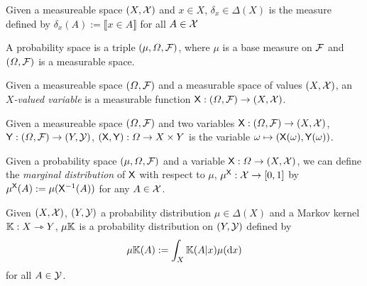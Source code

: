 \begin{definition}
Given a measureable space $(X,\mathcal{X})$ and $x\in X$, $\delta_x\in \Delta(X)$ is the measure defined by $\delta_x(A):=\llbracket x\in A \rrbracket$ for all $A\in \mathcal{X}$
\end{definition}

\begin{definition}
A probability space is a triple $(\mu,\Omega,\mathcal{F})$, where $\mu$ is a base measure on $\mathcal{F}$ and $(\Omega,\mathcal{F})$ is a measurable space.
\end{definition}

\begin{definition}[Variable]
Given a measureable space $(\Omega,\mathcal{F})$ and a measurable space of values $(X,\mathcal{X})$, an \emph{$X$-valued variable} is a measurable function $\mathsf{X}:(\Omega,\mathcal{F})\to (X,\mathcal{X})$.
\end{definition}

\begin{definition}
Given a measureable space $(\Omega,\mathcal{F})$ and two variables $\mathsf{X}:(\Omega,\mathcal{F})\to (X,\mathcal{X})$, $\mathsf{Y}:(\Omega,\mathcal{F})\to (Y,\mathcal{Y})$, $(\mathsf{X},\mathsf{Y}):\Omega\to X\times Y$ is the variable $\omega\mapsto (\mathsf{X}(\omega),\mathsf{Y}(\omega))$.
\end{definition}

\begin{definition}\label{def:pushforward}
Given a probability space $(\mu,\Omega,\mathcal{F})$ and a variable $\mathsf{X}:\Omega\to (X,\mathcal{X})$, we can define the \emph{marginal distribution} of $\mathsf{X}$ with respect to $\mu$, $\mu^{\mathsf{X}}:\mathcal{X}\to [0,1]$ by $\mu^{\mathsf{X}}(A):=\mu(\mathsf{X}^{-1}(A))$ for any $A\in \mathcal{X}$.
\end{definition}

\begin{definition}
Given $(X,\mathcal{X})$, $(Y,\mathcal{Y})$ a probability distribution $\mu\in \Delta(X)$ and a Markov kernel $\mathbb{K}:X\rightarrowtriangle Y$, $\mu\mathbb{K}$ is a probability distribution on $(Y,\mathcal{Y})$ defined by
\begin{align}
	\mu\mathbb{K}(A):= \int_{X} \mathbb{K}(A|x)\mu(\mathrm{d}x)
\end{align}
for all $A\in \mathcal{Y}$.
\end{definition}

